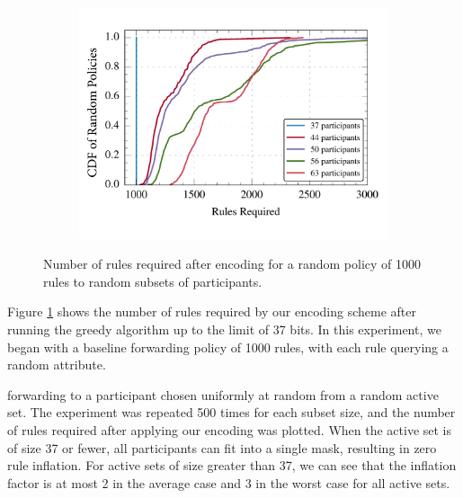 \begin{figure}[t!] 
\begin{minipage}{1\linewidth}
\begin{subfigure}[b]{0.96\linewidth}
\includegraphics[width=\linewidth]{figures/rule_cdf}
\end{subfigure} 
\end{minipage} 
\caption{Number of rules required after encoding for a random policy of 1000 rules to random subsets of participants.}
\label{fig:rules}
\end{figure}

Figure \ref{fig:rules} shows the number of rules required by our encoding scheme after running the greedy algorithm up to the limit of 37 bits. In this experiment, we began with a baseline forwarding policy of 1000 rules, with each rule querying a random attribute.

forwarding to a participant chosen uniformly at random from a random active set. The experiment was repeated 500 times for each subset size, and the number of rules required after applying our encoding was plotted. When the active set is of size 37 or fewer, all participants can fit into a single mask, resulting in zero rule inflation. For active sets of size greater than 37, we can see that the inflation factor is at most 2 in the average case and 3 in the worst case for all active sets. 


